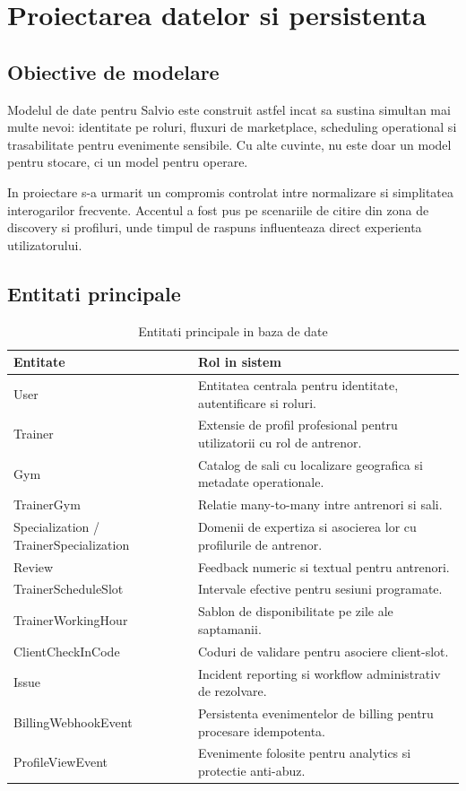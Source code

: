 \chapter{Proiectarea datelor si persistenta}

\section{Obiective de modelare}

Modelul de date pentru Salvio este construit astfel incat sa sustina simultan mai multe nevoi: identitate pe roluri, fluxuri de marketplace, scheduling operational si trasabilitate pentru evenimente sensibile. Cu alte cuvinte, nu este doar un model pentru stocare, ci un model pentru operare.

In proiectare s-a urmarit un compromis controlat intre normalizare si simplitatea interogarilor frecvente. Accentul a fost pus pe scenariile de citire din zona de discovery si profiluri, unde timpul de raspuns influenteaza direct experienta utilizatorului.

\section{Entitati principale}

\begin{table}[H]
\centering
\caption{Entitati principale in baza de date}
\begin{tabular}{p{} p{}}
\toprule
\textbf{Entitate} & \textbf{Rol in sistem} \\
\midrule
User & Entitatea centrala pentru identitate, autentificare si roluri. \\
Trainer & Extensie de profil profesional pentru utilizatorii cu rol de antrenor. \\
Gym & Catalog de sali cu localizare geografica si metadate operationale. \\
TrainerGym & Relatie many-to-many intre antrenori si sali. \\
Specialization / TrainerSpecialization & Domenii de expertiza si asocierea lor cu profilurile de antrenor. \\
Review & Feedback numeric si textual pentru antrenori. \\
TrainerScheduleSlot & Intervale efective pentru sesiuni programate. \\
TrainerWorkingHour & Sablon de disponibilitate pe zile ale saptamanii. \\
ClientCheckInCode & Coduri de validare pentru asociere client-slot. \\
Issue & Incident reporting si workflow administrativ de rezolvare. \\
BillingWebhookEvent & Persistenta evenimentelor de billing pentru procesare idempotenta. \\
ProfileViewEvent & Evenimente folosite pentru analytics si protectie anti-abuz. \\
\bottomrule
\end{tabular}
\end{table}

